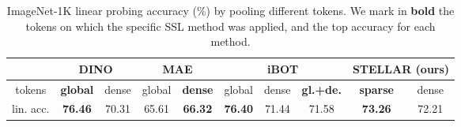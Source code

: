 \begin{table}[hb]
\caption{ImageNet-1K linear probing accuracy (\%) by pooling different tokens. We mark in \textbf{bold} the tokens on which the specific SSL method was applied, and the top accuracy for each method.}
\label{pooling-table}
\begin{center}
\begin{tabular}{c|cc|cc|ccc|cc}
\multicolumn{1}{c}{}   & \multicolumn{2}{c}{DINO} &  \multicolumn{2}{c}{MAE} & \multicolumn{3}{c}{iBOT} &\multicolumn{2}{c}{STELLAR (ours)} \\
\hline 
tokens &  \textbf{global} & dense & global & \textbf{dense} & global & dense & \textbf{gl.+de.} & \textbf{sparse} &  dense \\
\hline 
lin. acc.  & \textbf{76.46} & 70.31 & 65.61 & \textbf{66.32} & \textbf{76.40} & 71.44 &  71.58 & \textbf{73.26} &  72.21
\end{tabular}
\end{center}
\end{table}

